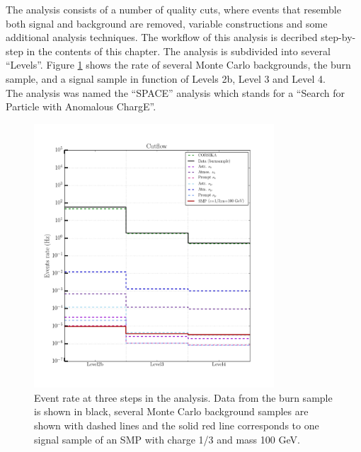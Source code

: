 \noindent The analysis consists of a number of quality cuts, where events that resemble both signal and background are removed, variable constructions and some additional analysis techniques. The workflow of this analysis is decribed step-by-step in the contents of this chapter. The analysis is subdivided into several ``Levels''. Figure \ref{fig:cutflow} shows the rate of several Monte Carlo backgrounds, the burn sample, and a signal sample in function of Levels 2b, Level 3 and Level 4.\\

\noindent The analysis was named the ``SPACE'' analysis which stands for a ``Search for Particle with Anomalous ChargE''.

\begin{figure}
\centering
\includegraphics[width=0.8\textwidth]{chapter8/img/CutFlow_Level2b_Level3_Level4.png}
\caption{Event rate at three steps in the analysis. Data from the burn sample is shown in black, several Monte Carlo background samples are shown with dashed lines and the solid red line corresponds to one signal sample of an SMP with charge 1/3 and mass 100 GeV.}
\label{fig:cutflow}
\end{figure}


